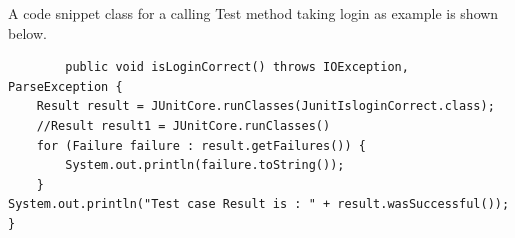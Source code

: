 \documentclass[article,type=msc,colorback,accentcolor=tud9c,twoside,11pt]{tudthesis}
\begin{document}
A code snippet class for a calling Test method taking login as example is shown below.
\begin{lstlisting}
		public void isLoginCorrect() throws IOException, ParseException {
	Result result = JUnitCore.runClasses(JunitIsloginCorrect.class);
	//Result result1 = JUnitCore.runClasses()
	for (Failure failure : result.getFailures()) {
		System.out.println(failure.toString());
	}
System.out.println("Test case Result is : " + result.wasSuccessful());
}
\end{lstlisting}

\cleardoublepage
\cleardoublepage


\end{document}
